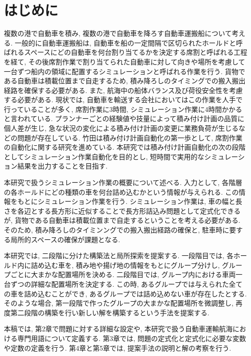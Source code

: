\chapter{はじめに}

複数の港で自動車を積み, 複数の港で自動車を降ろす自動車運搬船について考える. 
一般的に自動車運搬船は, 自動車を船の一定間隔で区切られたホールドと呼ばれるスペースにどの自動車を何台割り当てるかを決定する席割と呼ばれる工程を経て, 
その後席割作業で割り当てられた自動車に対して向きや場所を考慮して一台ずつ船内の領域に配置するシミュレーションと呼ばれる作業を行う. 
貨物である自動車は積載位置まで自走するため, 積み降ろしのタイミングでの搬入搬出経路を確保する必要がある. 
また, 航海中の船体バランス及び荷役安全性を考慮する必要がある. 
現状では, 自動車を輸送する会社においてはこの作業を人手で行っていることが多く, 席割作業に3時間, シミュレーション作業に4時間かかると言われている\cite{mitsui}. 
プランナーごとの経験値や技量によって積み付け計画の品質に個人差が生じ, 急な状況の変化による積み付け計画の変更に業務負荷が生じるなどの問題が存在している. 
竹田\cite{takeda}は積み付け計画自動化の第一歩として, 席割作業の自動化に関する研究を進めている. 
本研究では積み付け計画自動化の次の段階としてシミュレーション作業自動化を目的とし, 短時間で実用的なシミュレーション結果を出力することを目指す.  

本研究で扱うシミュレーション作業の概要について述べる. 
入力として, 各階層の各ホールドにどの種類の車を何台詰め込むかという情報が与えられる. 
この情報をもとにシミュレーション作業を行う. 
シミュレーション作業は, 車の幅と長さを各辺とする長方形に近似することで長方形詰込み問題として定式化できるが, 貨物である自動車は積載位置まで自走するということを考える必要がある. 
そのため, 積み降ろしのタイミンングでの搬入搬出経路の確保と, 駐車時に要する局所的スペースの確保が課題となる. 

本研究では, 二段階に分けた構築法と局所探索を提案する. 
一段階目では, 各ホールド内に詰め込む車を, 積み地や揚げ地の情報をもとにグループ分けし, グループごとに大まかな配置場所を決める. 
二段階目では, グループ内における車両一台ずつの詳細な配置場所を決定する. 
この時, あるグループでは与えられた全ての車を詰め込むことができ, あるグループでは詰め込めない車が存在したとする. 
そのような場合, 第一段階で作ったグループの大まかな配置場所を微調整し, 再度第二段階の構築を行い新しい解を構築するという手法を提案する. 


本稿では, 第2章で問題に対する詳細な設定や, 本研究で扱う自動車運輸航海における専門用語について定義する. 
第3章では, 問題の定式化と定式化に必要な変数や定数の定義を行う. 
第4章と第5章では, 提案手法の説明と解の考察を行う. 

